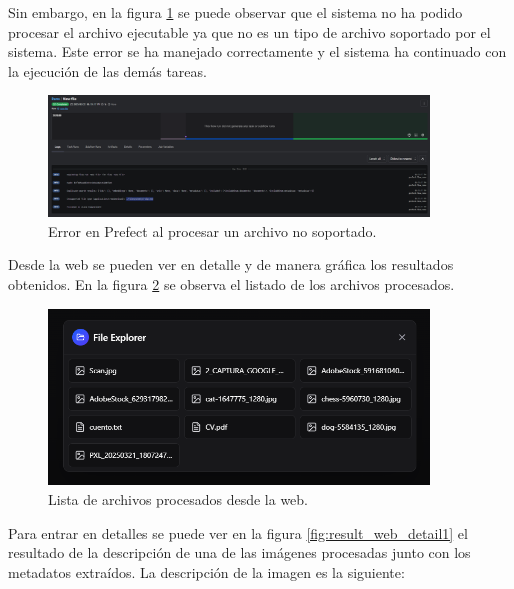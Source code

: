 Sin embargo, en la figura \ref{fig:prefect_not_valid} se puede observar que el sistema no ha podido procesar el archivo ejecutable ya que no es un tipo de archivo soportado por el sistema. Este error se ha manejado correctamente y el sistema ha continuado con la ejecución de las demás tareas.
\begin{figure}[H]
\centering
\includegraphics[width=0.9\textwidth]{archivos/prefect_not_valid.png}
\caption[Error en Prefect al procesar un archivo no soportado]{Error en Prefect al procesar un archivo no soportado.}
\label{fig:prefect_not_valid}
\end{figure}

Desde la web se pueden ver en detalle y de manera gráfica los resultados obtenidos. En la figura \ref{fig:result_web} se observa el listado de los archivos procesados.
\begin{figure}[H]
\centering
\includegraphics[width=0.9\textwidth]{archivos/result_web.png}
\caption[Lista de archivos procesados desde la web]{Lista de archivos procesados desde la web.}
\label{fig:result_web}
\end{figure}

Para entrar en detalles se puede ver en la figura \ref{fig:result_web_detail1} el resultado de la descripción de una de las imágenes procesadas junto con los metadatos extraídos. La descripción de la imagen es la siguiente:

